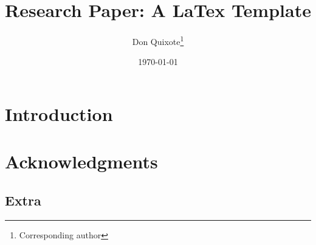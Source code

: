\documentclass[12pt]{research-paper}
\title{Research Paper: A LaTex Template}
\author{Don Quixote\thanks{Corresponding author}}
\affil{La Mancha}
\affil[ ]{\textit {\{email\}@lamancha.edu}}
\date{\today}
\begin{document}
	\maketitle
	
	\begin{abstract}
	
	\end{abstract}
	
	\toc
	
	\section{Introduction}\label{sec:intro}
	
	\section*{Acknowledgments}\label{sec:ack}
	
	
	\begin{appendices}
	
	\section{Extra}\label{sec:app}
		
	\end{appendices}
\end{document}
